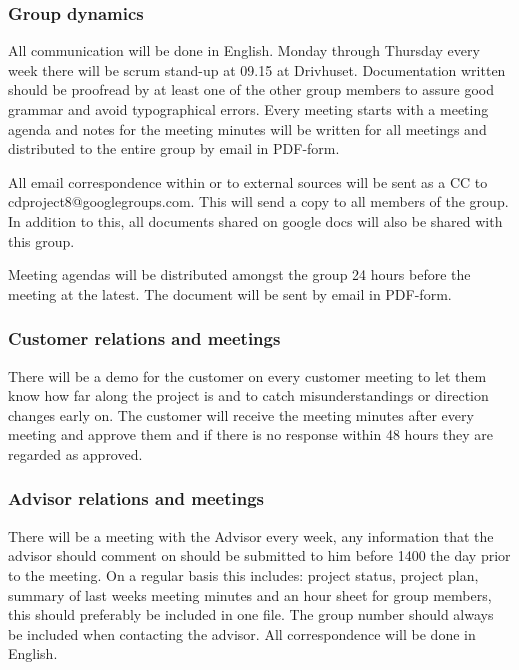 \subsubsection{Group dynamics}

All communication will be done in English.
Monday through Thursday every week there will be scrum stand-up at 09.15 at Drivhuset.
Documentation written should be proofread by at least one of the other group members
to assure good grammar and avoid typographical errors.
Every meeting starts with a meeting agenda and notes for the meeting minutes will be
written for all meetings and distributed to the entire group by email in
PDF-form.

All email correspondence within or to external sources will be sent as a CC to
cdproject8@googlegroups.com. This will send a copy to all members of the group.
In addition to this, all documents shared on google docs will also be shared
with this group.

Meeting agendas will be distributed amongst the group 24 hours before the
meeting at the latest. The document will be sent by email in PDF-form. 

\subsubsection{Customer relations and meetings}
There will be a demo for the customer on every customer meeting to let them
know how far along the project is and to catch misunderstandings or direction changes early on.
The customer will receive the meeting minutes after every meeting and approve
them and if there is no response within 48 hours they are regarded as approved.

\subsubsection{Advisor relations and meetings}
There will be a meeting with the Advisor every week, any information that the advisor
should comment on should be submitted to him before 1400 the day prior to the meeting.
On a regular basis this includes: project status, project plan, summary of last weeks
meeting minutes and an hour sheet for group members, this should preferably be
included in one file.
The group number should always be included when contacting the advisor. All
correspondence will be done in English.
